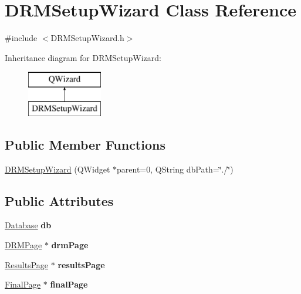 \hypertarget{class_d_r_m_setup_wizard}{}\section{D\+R\+M\+Setup\+Wizard Class Reference}
\label{class_d_r_m_setup_wizard}


{\ttfamily \#include $<$D\+R\+M\+Setup\+Wizard.\+h$>$}

Inheritance diagram for D\+R\+M\+Setup\+Wizard\+:\begin{figure}[H]
\begin{center}
\leavevmode
\includegraphics[height=2.000000cm]{class_d_r_m_setup_wizard}
\end{center}
\end{figure}
\subsection*{Public Member Functions}
\begin{DoxyCompactItemize}
\item 
\hyperlink{class_d_r_m_setup_wizard_a432b7cbe80a995c5816e32ef869f0fe9}{D\+R\+M\+Setup\+Wizard} (Q\+Widget $\ast$parent=0, Q\+String db\+Path=\char`\"{}./\char`\"{})
\end{DoxyCompactItemize}
\subsection*{Public Attributes}
\begin{DoxyCompactItemize}
\item 
\hypertarget{class_d_r_m_setup_wizard_a3022199aa9a19d136902dcd9d01c8211}{}\hyperlink{class_database}{Database} {\bfseries db}\label{class_d_r_m_setup_wizard_a3022199aa9a19d136902dcd9d01c8211}

\item 
\hypertarget{class_d_r_m_setup_wizard_a66edadb1ac9927977148c66af5ad43b7}{}\hyperlink{class_d_r_m_page}{D\+R\+M\+Page} $\ast$ {\bfseries drm\+Page}\label{class_d_r_m_setup_wizard_a66edadb1ac9927977148c66af5ad43b7}

\item 
\hypertarget{class_d_r_m_setup_wizard_aa0a221bcfa98af995e2b844cf831f413}{}\hyperlink{class_results_page}{Results\+Page} $\ast$ {\bfseries results\+Page}\label{class_d_r_m_setup_wizard_aa0a221bcfa98af995e2b844cf831f413}

\item 
\hypertarget{class_d_r_m_setup_wizard_a1894fa5909dc5bf11e03e9d7ca91232e}{}\hyperlink{class_final_page}{Final\+Page} $\ast$ {\bfseries final\+Page}\label{class_d_r_m_setup_wizard_a1894fa5909dc5bf11e03e9d7ca91232e}

\end{DoxyCompactItemize}


